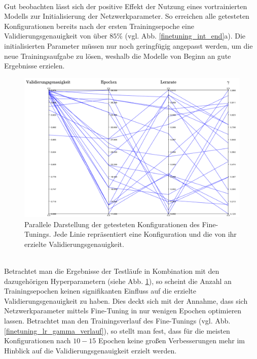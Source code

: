 \\
Gut beobachten lässt sich der positive Effekt der Nutzung eines vortrainierten Modells zur Initialisierung der Netzwerkparameter. So erreichen alle getesteten Konfigurationen bereits nach der ersten Trainingsepoche eine Validierungsgenauigkeit von über $85\%$ (vgl. Abb. \ref{finetuning_int_end}a). Die initialisierten Parameter müssen nur noch geringfügig angepasst werden, um die neue Trainingsaufgabe zu lösen, weshalb die Modelle von Beginn an gute Ergebnisse erzielen. 
\begin{figure}[h]
\includegraphics[scale=0.58]{NNOPT/finetuning_all.pdf}
\caption{Parallele Darstellung der getesteten Konfigurationen des Fine-Tunings. Jede Linie repräsentiert eine Konfiguration und die von ihr erzielte Validierungsgenauigkeit.}
\label{finetuning_all}
\end{figure}
\\
Betrachtet man die Ergebnisse der Testläufe in Kombination mit den dazugehörigen Hyperparametern (siehe Abb. \ref{finetuning_all}), so scheint die Anzahl an Trainingsepochen keinen signifikanten Einfluss auf die erzielte Validierungsgenauigkeit zu haben. Dies deckt sich mit der Annahme, dass sich Netzwerkparameter mittels Fine-Tuning in nur wenigen Epochen optimieren lassen. Betrachtet man den Trainingsverlauf des Fine-Tunings (vgl. Abb. \ref{finetuning_lr_gamma_verlauf}), so stellt man fest, dass für die meisten Konfigurationen nach $10-15$ Epochen keine großen Verbesserungen mehr im Hinblick auf die Validierungsgenauigkeit erzielt werden.  
